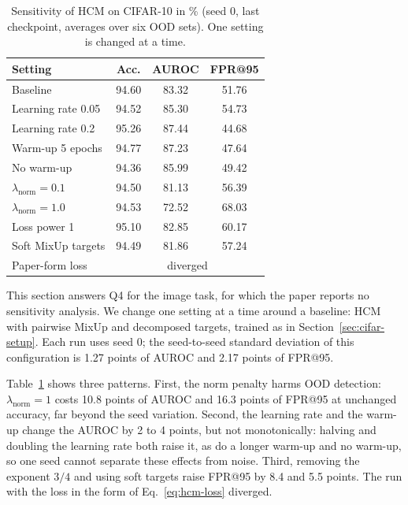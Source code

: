 \documentclass[letterpaper]{article} %
\begin{document}
\begin{table}[t]
  \centering
  \small
  \setlength{\tabcolsep}{1.5mm}
  \begin{tabular}{@{}lccc@{}}
    \toprule
    Setting & Acc. & AUROC & FPR@95 \\
    \midrule
    Baseline & 94.60 & 83.32 & 51.76 \\
    Learning rate 0.05 & 94.52 & 85.30 & 54.73 \\
    Learning rate 0.2 & 95.26 & 87.44 & 44.68 \\
    Warm-up 5 epochs & 94.77 & 87.23 & 47.64 \\
    No warm-up & 94.36 & 85.99 & 49.42 \\
    $\lambda_{\text{norm}}=0.1$ & 94.50 & 81.13 & 56.39 \\
    $\lambda_{\text{norm}}=1.0$ & 94.53 & 72.52 & 68.03 \\
    Loss power 1 & 95.10 & 82.85 & 60.17 \\
    Soft MixUp targets & 94.49 & 81.86 & 57.24 \\
    Paper-form loss & \multicolumn{3}{c}{diverged} \\
    \bottomrule
  \end{tabular}
  \caption{Sensitivity of HCM on CIFAR-10 in \% (seed 0, last checkpoint, averages over six OOD sets). One setting is changed at a time.}
  \label{tab:sensitivity}
\end{table}

This section answers Q4 for the image task, for which the paper reports no sensitivity analysis. We change one setting at a time around a baseline: HCM with pairwise MixUp and decomposed targets, trained as in Section~\ref{sec:cifar-setup}. Each run uses seed 0; the seed-to-seed standard deviation of this configuration is 1.27 points of AUROC and 2.17 points of FPR@95.

Table~\ref{tab:sensitivity} shows three patterns. First, the norm penalty harms OOD detection: $\lambda_{\text{norm}}=1$ costs 10.8 points of AUROC and 16.3 points of FPR@95 at unchanged accuracy, far beyond the seed variation. Second, the learning rate and the warm-up change the AUROC by 2 to 4 points, but not monotonically: halving and doubling the learning rate both raise it, as do a longer warm-up and no warm-up, so one seed cannot separate these effects from noise. Third, removing the exponent $3/4$ and using soft targets raise FPR@95 by 8.4 and 5.5 points. The run with the loss in the form of Eq.~\eqref{eq:hcm-loss} diverged.
\end{document}
